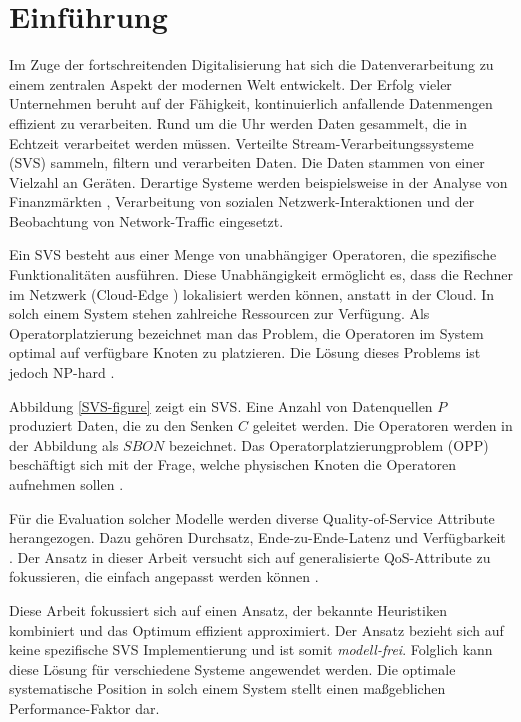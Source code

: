 \documentclass{article}
\begin{document}
\section{Einführung}
Im Zuge der fortschreitenden Digitalisierung hat sich die Datenverarbeitung zu einem zentralen Aspekt der modernen Welt entwickelt.
Der Erfolg vieler Unternehmen beruht auf der Fähigkeit, kontinuierlich anfallende Datenmengen effizient zu verarbeiten.
Rund um die Uhr werden Daten gesammelt, die in Echtzeit verarbeitet werden müssen. 
Verteilte Stream-Verarbeitungssysteme (SVS) sammeln, filtern und verarbeiten Daten. Die Daten stammen von einer Vielzahl an Geräten.
Derartige Systeme werden beispielsweise in der Analyse von Finanzmärkten \cite{k5}, 
Verarbeitung von sozialen Netzwerk-Interaktionen und der Beobachtung von Network-Traffic \cite{k5} 
eingesetzt. 

Ein SVS besteht aus einer Menge von unabhängiger Operatoren, die spezifische
Funktionalitäten ausführen. Diese Unabhängigkeit ermöglicht es, dass die Rechner im Netzwerk (Cloud-Edge \cite{k6}) lokalisiert werden können, 
anstatt in der Cloud.
In solch einem System stehen zahlreiche Ressourcen zur Verfügung. 
Als Operatorplatzierung bezeichnet man das Problem, 
die Operatoren im System optimal auf verfügbare Knoten zu platzieren. 
Die Lösung dieses Problems ist jedoch NP-hard \cite{cardellini-optimal_operatorplc}.

Abbildung \ref{SVS-figure} zeigt ein SVS. Eine Anzahl von Datenquellen $P$ produziert Daten, die zu den Senken $C$ geleitet werden. Die Operatoren 
werden in der Abbildung als $SBON$ bezeichnet. Das Operatorplatzierungproblem (OPP) beschäftigt sich mit der Frage, 
welche physischen Knoten die Operatoren aufnehmen sollen \cite{network-aware-op}. 

Für die Evaluation solcher Modelle werden diverse Quality-of-Service Attribute herangezogen. 
Dazu gehören Durchsatz, Ende-zu-Ende-Latenz und Verfügbarkeit \cite{efficient-operator-placement,cardellini-optimal_operatorplc}.
 Der Ansatz in dieser Arbeit versucht sich auf generalisierte QoS-Attribute 
zu fokussieren, die einfach angepasst werden können \cite{efficient-operator-placement}.

Diese Arbeit fokussiert sich auf einen Ansatz, der bekannte Heuristiken kombiniert und das Optimum effizient approximiert. 
Der Ansatz bezieht sich auf keine spezifische SVS Implementierung und ist somit \textit{modell-frei}. Folglich kann diese Lösung für verschiedene Systeme angewendet werden.
Die optimale systematische Position in solch einem System stellt einen maßgeblichen Performance-Faktor dar. 
\end{document}
